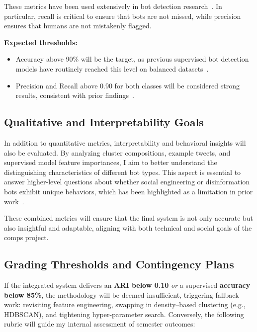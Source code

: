 \documentclass[10pt,twocolumn]{article}
\begin{document}
These metrics have been used extensively in bot detection research~\cite{varol2017online,Hayawi2023social,Orabi2020detection}. In particular, recall is critical to ensure that bots are not missed, while precision ensures that humans are not mistakenly flagged.

\textbf{Expected thresholds:}
\begin{itemize}
    \item Accuracy above 90\% will be the target, as previous supervised bot detection models have routinely reached this level on balanced datasets~\cite{Hayawi2023social}.
    \item Precision and Recall above 0.90 for both classes will be considered strong results, consistent with prior findings~\cite{Orabi2020detection,Kudugunta2018deep}.
\end{itemize}

\subsection{Qualitative and Interpretability Goals}

In addition to quantitative metrics, interpretability and behavioral insights will also be evaluated. By analyzing cluster compositions, example tweets, and supervised model feature importances, I aim to better understand the distinguishing characteristics of different bot types. This aspect is essential to answer higher-level questions about whether social engineering or disinformation bots exhibit unique behaviors, which has been highlighted as a limitation in prior work~\cite{cresci2017paradigm,Yang2023anatomy}.

These combined metrics will ensure that the final system is not only accurate but also insightful and adaptable, aligning with both technical and social goals of the comps project.

\subsection{Grading Thresholds and Contingency Plans}

If the integrated system delivers an \textbf{ARI below 0.10} \emph{or} a supervised \textbf{accuracy below 85\%}, the methodology will be deemed insufficient, triggering fallback work: revisiting feature engineering, swapping in density–based clustering (e.g., HDBSCAN), and tightening hyper-parameter search.  
Conversely, the following rubric will guide my internal assessment of semester outcomes:
\end{document}
